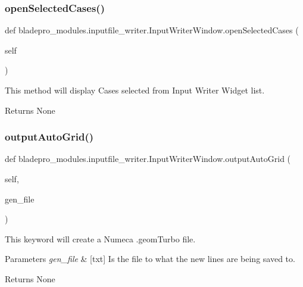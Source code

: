 \subsubsection{\texorpdfstring{open\+Selected\+Cases()}{openSelectedCases()}}
{\footnotesize\ttfamily def bladepro\+\_\+modules.\+inputfile\+\_\+writer.\+Input\+Writer\+Window.\+open\+Selected\+Cases (\begin{DoxyParamCaption}\item[{}]{self }\end{DoxyParamCaption})}



This method will display Cases selected from Input Writer Widget list. 

\begin{DoxyReturn}{Returns}
None 
\end{DoxyReturn}
\hypertarget{a00073_a61f9db1d33a2cb583c3f779a94ec700d}{}\label{a00073_a61f9db1d33a2cb583c3f779a94ec700d} 
\subsubsection{\texorpdfstring{output\+Auto\+Grid()}{outputAutoGrid()}}
{\footnotesize\ttfamily def bladepro\+\_\+modules.\+inputfile\+\_\+writer.\+Input\+Writer\+Window.\+output\+Auto\+Grid (\begin{DoxyParamCaption}\item[{}]{self,  }\item[{}]{gen\+\_\+file }\end{DoxyParamCaption})}



This keyword will create a Numeca .geom\+Turbo file. 


\begin{DoxyParams}{Parameters}
{\em gen\+\_\+file} & \mbox{[}txt\mbox{]} Is the file to what the new lines are being saved to. \\
\hline
\end{DoxyParams}
\begin{DoxyReturn}{Returns}
None 
\end{DoxyReturn}
\hypertarget{a00073_ab5d0d97e4bf1dd0ddf28f4f537fea598}{}\label{a00073_ab5d0d97e4bf1dd0ddf28f4f537fea598} 
